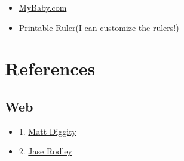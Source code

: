 \documentclass[12pt]{article}
\begin{document}
\begin{itemize}

    \item \href{https://www.mybabyboutique.us/}{MyBaby.com}
    \item \href{https://www.printable-ruler.net/}{Printable Ruler(I can customize the rulers!)}
\end{itemize}


\section{References}
\subsection{Web}
\begin{itemize}
    \item 1. \href{https://www.youtube.com/watch?v=UaJIkkZbaEY}{Matt Diggity}
    \item 2. \href{https://jaserodley.com/website-flipping/}{Jase Rodley}
\end{itemize}
    
\end{document}
